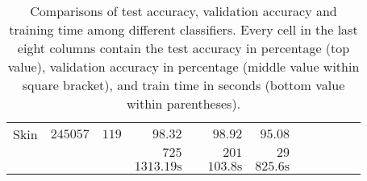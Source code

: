 \begin{table}
\begin{center}
\begin{tabular}{l  r  r r r r r r r rrr}
			{ Skin}   & $  245057 $  & $  119 $  & $   98.32  $    &   \multicolumn{1}{c}{\multirow{3}{*}{\textemdash}}       & $   98.92  $    & $   95.08  $   \\ & & 
			& $   725 $    &       & $   201 $    & $   29 $   \\ & & 
			& $   1313.19 \text{s}  $    &       & $   103.8 \text{s}  $    & $   825.6 \text{s}  $   \\[.1cm] 
			\bottomrule
		\end{tabular}
	\end{center}
	\caption{Comparisons of test accuracy, validation accuracy and training time among different classifiers. Every cell in the last eight columns contain the test accuracy in percentage (top value), validation accuracy in percentage (middle value within square bracket), and  train time in seconds (bottom value within  parentheses).}
	\label{tab:result}
\end{table}



